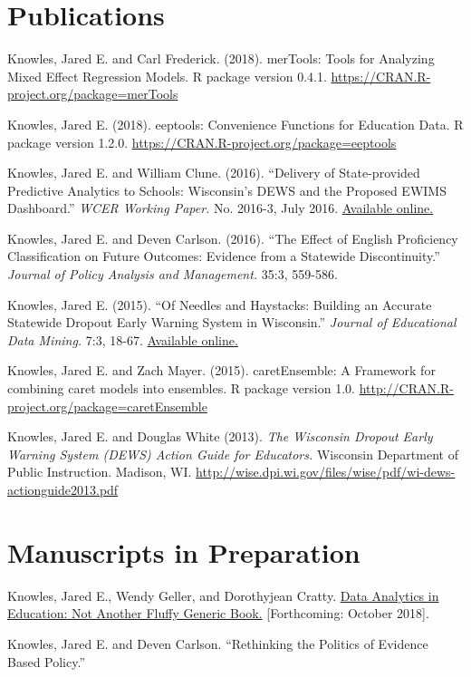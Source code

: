 \documentclass[margin,line]{res}
\begin{document}
\begin{resume}
\section{\sc Publications}

Knowles, Jared E. and Carl Frederick. (2018). merTools: Tools for Analyzing Mixed 
Effect Regression Models. R package version 0.4.1. 
\url{https://CRAN.R-project.org/package=merTools}

Knowles, Jared E. (2018). eeptools: Convenience Functions for Education Data. 
R package version 1.2.0. \url{https://CRAN.R-project.org/package=eeptools}

Knowles, Jared E. and William Clune. (2016). ``Delivery of State-provided Predictive
Analytics to Schools: Wisconsin’s DEWS and the Proposed EWIMS Dashboard.'' 
\emph{WCER Working Paper.} No. 2016-3, July 2016. \href{http://wcer-web.ad.education.wisc.edu/docs/working-papers/Working_Paper_No_2016_03.pdf}{Available online.}

Knowles, Jared E. and Deven Carlson. (2016). ``The Effect of English Proficiency Classification on Future Outcomes: 
Evidence from a Statewide Discontinuity.'' \emph{Journal of Policy Analysis and Management.}
35:3, 559-586. 

Knowles, Jared E. (2015). ``Of Needles and Haystacks: Building an Accurate Statewide 
Dropout Early Warning System in Wisconsin.'' \emph{Journal of Educational Data 
Mining.} 7:3, 18-67. 
\href{http://www.educationaldatamining.org/JEDM/index.php/JEDM/article/view/JEDM082}{Available online.}

Knowles, Jared E. and Zach Mayer. (2015). caretEnsemble: A Framework for combining 
caret models into ensembles. R package version 1.0. \url{http://CRAN.R-project.org/package=caretEnsemble}

Knowles, Jared E. and Douglas White (2013). \emph{The Wisconsin Dropout Early Warning System (DEWS) Action Guide for Educators.} Wisconsin Department of Public Instruction. Madison, WI. \url{http://wise.dpi.wi.gov/files/wise/pdf/wi-dews-actionguide2013.pdf}

\section{\sc Manuscripts in Preparation}

Knowles, Jared E., Wendy Geller, and Dorothyjean Cratty. \uline{Data Analytics in 
Education: Not Another Fluffy Generic Book.} [Forthcoming: October 2018].

Knowles, Jared E. and Deven Carlson. ``Rethinking the Politics of Evidence Based 
Policy.'' 


\end{resume}
\end{document}

